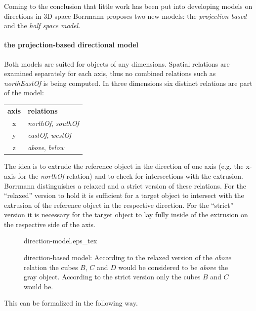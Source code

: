 \documentclass[paper=a4, fontsize=11pt]{scrartcl} %
\numberwithin{equation}{section} %
\numberwithin{figure}{section} %
\numberwithin{table}{section} %
\begin{document}
Coming to the conclusion that little work has been put into developing models on directions in 3D space Borrmann \cite{Borrmann:2009:AEI} proposes two new models:  the \textit{projection based} and the \textit{half space model}. 


\paragraph{the projection-based directional model}\label{sec:proj-based-direct}
Both models are suited for objects of any dimensions. Spatial relations are examined separately for each axis, thus no combined relations such as \emph{northEastOf} is being computed. In three dimensions six distinct relations are part of the model:
\begin{table}[h!]
  \begin{tabular}{cl}
    \textbf{axis} & \textbf{relations} \\
    x  & \emph{northOf}, \emph{southOf} \\
    y  & \emph{eastOf}, \emph{westOf} \\
    z  & \emph{above}, \emph{below}
  \end{tabular}
\end{table}

The idea is to extrude the reference object in the direction of one axis (e.g. the x-axis for the \emph{northOf} relation) and to check for intersections with the extrusion. Borrmann distinguishes a relaxed and a strict version of these relations. For the ``relaxed'' version to hold it is sufficient for a target object to intersect with the extrusion of the reference object in the respective direction. For the ``strict'' version it is necessary for the target object to lay fully inside of the extrusion on the respective side of the axis. 

\begin{figure}
  \centering
  \def\svgwidth{20em}
  {direction-model.eps_tex}
  \caption{direction-based model: According to the relaxed version of the \emph{above} relation the cubes $B$, $C$ and $D$ would be considered to be \emph{above} the gray object. According to the strict version only the cubes $B$ and $C$ would be. }
  \label{fig:direction-model}
\end{figure}


This can be formalized in the following way. 

\end{document}
